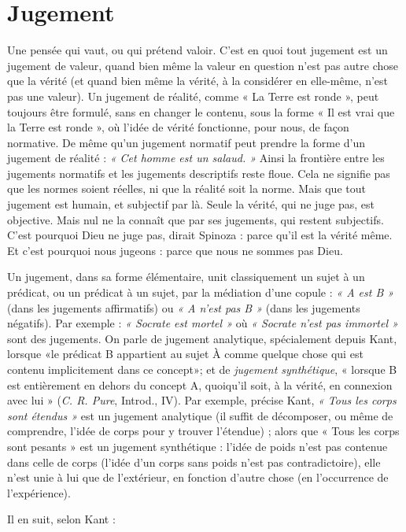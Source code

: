 {\section{Jugement}
Une pensée qui vaut, ou qui prétend valoir. C’est en quoi tout
jugement est un jugement de valeur, quand bien même la
valeur en question n’est pas autre chose que la vérité (et quand bien même la
vérité, à la considérer en elle-même, n’est pas une valeur). Un jugement de réalité,
comme « La Terre est ronde », peut toujours être formulé, sans en changer
le contenu, sous la forme « Il est vrai que la Terre est ronde », où l’idée de vérité
fonctionne, pour nous, de façon normative. De même qu’un jugement normatif
peut prendre la forme d’un jugement de réalité : {\it « Cet homme est un
salaud. »} Ainsi la frontière entre les jugements normatifs et les jugements descriptifs
reste floue. Cela ne signifie pas que les normes soient réelles, ni que la
réalité soit la norme. Mais que tout jugement est humain, et subjectif par là.
Seule la vérité, qui ne juge pas, est objective. Mais nul ne la connaît que par ses
jugements, qui restent subjectifs. C’est pourquoi Dieu ne juge pas, dirait
Spinoza : parce qu’il est la vérité même. Et c’est pourquoi nous jugeons : parce
que nous ne sommes pas Dieu.

Un jugement, dans sa forme élémentaire, unit classiquement un sujet à un
prédicat, ou un prédicat à un sujet, par la médiation d’une copule : {\it « A est B »}
(dans les jugements affirmatifs) ou {\it « A n'est pas B »} (dans les jugements négatifs).
Par exemple : {\it « Socrate est mortel »} où {\it « Socrate n'est pas immortel »} sont
des jugements. On parle de jugement analytique, spécialement depuis Kant,
lorsque «le prédicat B appartient au sujet À comme quelque chose qui est
contenu implicitement dans ce concept»; et de {\it jugement synthétique},
« lorsque B est entièrement en dehors du concept A, quoiqu'il soit, à la vérité,
en connexion avec lui » ({\it C. R. Pure}, Introd., IV). Par exemple, précise Kant,
{\it « Tous les corps sont étendus »} est un jugement analytique (il suffit de décomposer,
ou même de comprendre, l’idée de corps pour y trouver l'étendue) ;
alors que « Tous les corps sont pesants » est un jugement synthétique : l’idée de
poids n’est pas contenue dans celle de corps (l’idée d’un corps sans poids n’est
pas contradictoire), elle n’est unie à lui que de l’extérieur, en fonction d’autre
chose (en l'occurrence de l’expérience).

Il en suit, selon Kant :

}
